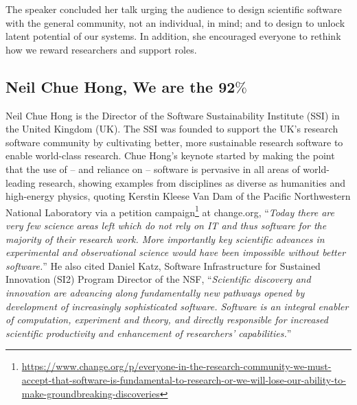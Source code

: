 \documentclass[11pt, oneside]{amsart}
\begin{document}
The speaker concluded her talk urging the audience to design scientific software
with the general community, not an individual, in mind; and to design to unlock
latent potential of our systems. In addition, she encouraged everyone to rethink
how we reward researchers and support roles.


\subsection{Neil Chue Hong, We are the 92$\%$~\cite{Hong_slides}}
\label{keynote2}
\begin{comment}
In a recent survey of UK research-intensive universities, 92\% of researchers
said they used research software and 68\% said their research would be impossible
without software. Yet 71\% have had no formal software training, and few are
ready to apply many of the things we take for granted such as testing or
virtualization. WSSSPE represents the pinnacle of what we understand to be the
best practice around scientific software in our community. My talk will
challenge the workshop participants to come up with ways of taking this best
practice to those 92\% of researchers in a way that will lead to maximum benefit
to the scientific community.
 \end{comment}


Neil Chue Hong is the Director of the Software Sustainability Institute (SSI) in the
United Kingdom (UK). The SSI was founded to support the UK's research software
community by cultivating better, more sustainable research software to enable
world-class research. Chue Hong's keynote started by making the point
that the use of -- and reliance on -- software is pervasive in all areas of
world-leading research, showing examples from disciplines as diverse as
humanities and high-energy physics, quoting Kerstin Kleese Van Dam of the
Pacific Northwestern National Laboratory via a petition
campaign\footnote{\url{https://www.change.org/p/everyone-in-the-research-community-we-must-accept-that-software-is-fundamental-to-research-or-we-will-lose-our-ability-to-make-groundbreaking-discoveries}}
at change.org, ``\emph{Today there are very few science areas left which do not
rely on IT and thus software for the majority of their research work. More
importantly key scientific advances in experimental and observational science
would have been impossible without better software.}'' He also cited Daniel
Katz, Software Infrastructure for Sustained Innovation (SI2) Program Director of
the NSF, ``\emph{Scientific discovery and innovation are advancing along
fundamentally new pathways opened by development of increasingly sophisticated
software. Software is an integral enabler of computation, experiment and theory,
and directly responsible for increased scientific productivity and enhancement
of researchers' capabilities.}''
\end{document}
